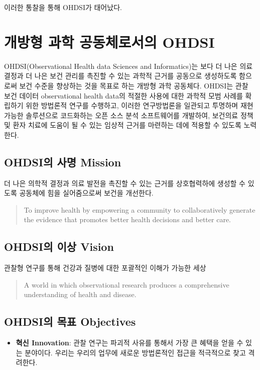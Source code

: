 \documentclass[10.5pt]{book}
\providecommand{\tightlist}{%
  \setlength{\itemsep}{0pt}\setlength{\parskip}{0pt}}
\theoremstyle{definition}
\theoremstyle{definition}
\theoremstyle{definition}
\theoremstyle{remark}
\begin{document}
이러한 통찰을 통해 OHDSI가 태어났다.

\section{개방형 과학 공동체로서의 OHDSI}\label{---ohdsi}

OHDSI(Observational Health data Sciences and Informatics)는 보다 더 나은
의료 결정과 더 나은 보건 관리를 촉진할 수 있는 과학적 근거를 공동으로
생성하도록 함으로써 보건 수준을 향상하는 것을 목표로 하는 개방형 과학
공동체다. \citep{Hripcsak2015} OHDSI는 관찰 보건 데이터 observational
health data의 적절한 사용에 대한 과학적 모범 사례를 확립하기 위한
방법론적 연구를 수행하고, 이러한 연구방법론을 일관되고 투명하며 재현
가능한 솔루션으로 코드화하는 오픈 소스 분석 소프트웨어를 개발하여,
보건의료 정책 및 환자 치료에 도움이 될 수 있는 임상적 근거를 마련하는
데에 적용할 수 있도록 노력한다.

\subsection{OHDSI의 사명 Mission}\label{ohdsi--mission}

더 나은 의학적 결정과 의료 발전을 촉진할 수 있는 근거를 상호협력하에
생성할 수 있도록 공동체에 힘을 실어줌으로써 보건을 개선한다.

\begin{quote}
To improve health by empowering a community to collaboratively generate
the evidence that promotes better health decisions and better care.
\end{quote}

\subsection{OHDSI의 이상 Vision}\label{ohdsi--vision}

관찰형 연구를 통해 건강과 질병에 대한 포괄적인 이해가 가능한 세상

\begin{quote}
A world in which observational research produces a comprehensive
understanding of health and disease. 
\end{quote}

\subsection{OHDSI의 목표 Objectives}\label{ohdsi--objectives}

\begin{itemize}
\tightlist
\item
  \textbf{혁신 Innovation}: 관찰 연구는 파괴적 사유를 통해서 가장 큰
  혜택을 얻을 수 있는 분야이다. 우리는 우리의 업무에 새로운 방법론적인
  접근을 적극적으로 찾고 격려한다.
\end{itemize}
\end{document}
